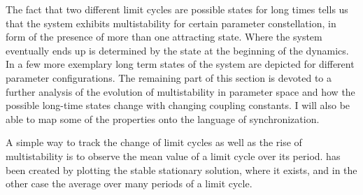 The fact that two different limit cycles are possible states for long times tells us that the system exhibits multistability for certain parameter constellation, in form of the presence of more than one attracting state. Where the system eventually ends up is determined by the state at the beginning of the dynamics. In  a few more exemplary long term states of the system are depicted for different parameter configurations.
The remaining part of this section is devoted to a further analysis of the evolution of multistability in parameter space and how the possible long-time states change with changing coupling constants. I will also be able to map some of the properties onto the language of synchronization.

A simple way to track the change of limit cycles as well as the rise of multistability is to observe the mean value of a limit cycle over its period.
 has been created by plotting the stable stationary solution, where it exists, and in the other case the average over many periods of a limit cycle.




